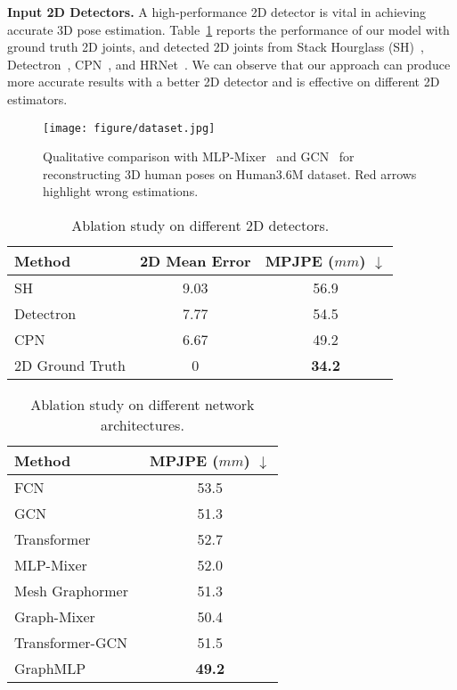 \documentclass[lettersize,journal]{IEEEtran}
\begin{document}
\noindent \textbf{Input 2D Detectors.}
A high-performance 2D detector is vital in achieving accurate 3D pose estimation. 
Table~\ref{table:detectors} reports the performance of our model with ground truth 2D joints, and detected 2D joints from Stack Hourglass (SH)~\cite{newell2016stacked}, Detectron~\cite{videopose}, CPN~\cite{chen2018cascaded}, and HRNet~\cite{hrnet}. 
We can observe that our approach can produce more accurate results with a better 2D detector and is effective on different 2D estimators. 

\begin{figure*}[t]
  \centering
  \texttt{[image: figure/dataset.jpg]}
  \caption
  {
    Qualitative comparison with MLP-Mixer~\cite{mlpmixer} and GCN~\cite{stgcn} for reconstructing 3D human poses on Human3.6M dataset. 
    Red arrows highlight wrong estimations. 
  }
  \label{fig:dataset}
\end{figure*}

\begin{table}[t]
  \centering
  \caption
  {
    Ablation study on different 2D detectors. 
  }
  \setlength{\tabcolsep}{4.50mm}
  \begin{tabular}{lcc}
  \toprule
  Method &2D Mean Error &MPJPE ($mm$) $\downarrow$ \\
  \midrule
  SH~\cite{newell2016stacked} &9.03 &56.9 \\ 
  Detectron~\cite{videopose} &7.77  &54.5 \\
  CPN~\cite{chen2018cascaded} &6.67 &49.2 \\

  2D Ground Truth &0 &\textbf{34.2} \\
  \toprule
  \end{tabular}
  \label{table:detectors}
\end{table}

\begin{table}[t]
  \centering
  \caption
  {
    Ablation study on different network architectures. 
  }
  \setlength{\tabcolsep}{7.30mm}
  \begin{tabular}{lc}
  \toprule
  Method &MPJPE ($mm$) $\downarrow$ \\
  \midrule
  FCN~\cite{simplebaseline} &53.5 \\
  GCN~\cite{stgcn} &51.3 \\
  Transformer~\cite{transformer} &52.7 \\
  MLP-Mixer~\cite{mlpmixer} &52.0 \\
  Mesh Graphormer~\cite{meshgraphormer} &51.3 \\
  \midrule
  Graph-Mixer& 50.4 \\
  Transformer-GCN& 51.5 \\
  GraphMLP &\textbf{49.2} \\

  \toprule
  \end{tabular}
  \label{table:architecture}
\end{table}
\end{document}
